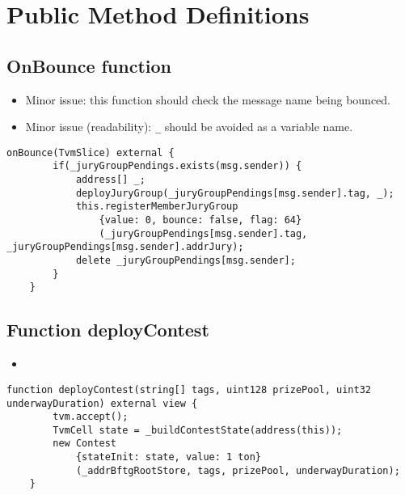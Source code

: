 \section{Public Method Definitions}


\subsection{OnBounce function}

\begin{itemize}
\item Minor issue: this function should check the message name being
  bounced.
\item Minor issue (readability): {\tt \_} should be avoided as a
  variable name.
\end{itemize}

\begin{lstlisting}[firstnumber=83]
    onBounce(TvmSlice) external {
        if(_juryGroupPendings.exists(msg.sender)) {
            address[] _;
            deployJuryGroup(_juryGroupPendings[msg.sender].tag, _);
            this.registerMemberJuryGroup
                {value: 0, bounce: false, flag: 64}
                (_juryGroupPendings[msg.sender].tag, _juryGroupPendings[msg.sender].addrJury);
            delete _juryGroupPendings[msg.sender];
        }
    }
\end{lstlisting}

\subsection{Function deployContest}

\begin{itemize}
\item {}
\end{itemize}

\begin{lstlisting}[firstnumber=98]
    function deployContest(string[] tags, uint128 prizePool, uint32 underwayDuration) external view {
        tvm.accept();
        TvmCell state = _buildContestState(address(this));
        new Contest
            {stateInit: state, value: 1 ton}
            (_addrBftgRootStore, tags, prizePool, underwayDuration);
    }
\end{lstlisting}

